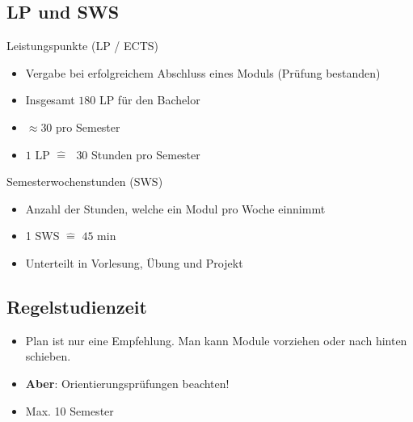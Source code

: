 \documentclass[
	aspectratio=169, 
	8pt 
]{beamer}
\begin{document}
\subsection{LP und SWS}
\begin{frame}{\insertsubsection}
    \begin{fancycolumns}[T]

        \begin{definition}{Leistungspunkte (LP / ECTS)\footnotemark[1]}
            \begin{itemize}
                \item Vergabe bei erfolgreichem Abschluss eines Moduls (Prüfung bestanden)
                \item Insgesamt $180$ LP für den Bachelor
                \item $\approx 30$ pro Semester
                \item $1 \text{ LP } \hat{=} \text{ } 30$ Stunden pro Semester
            \end{itemize}
        \end{definition}

        \nextcolumn
        
        \begin{definition}{Semesterwochenstunden (SWS)\footnotemark[2]}
            \begin{itemize}
                \item Anzahl der Stunden, welche ein Modul pro Woche einnimmt
                \item 1 SWS $\hat{=}$ $45$ min
                \item Unterteilt in Vorlesung, Übung und Projekt
            \end{itemize}
        \end{definition}
    \end{fancycolumns}

\end{frame}


\subsection{Regelstudienzeit}
\begin{frame}{\insertsubsection}
    \begin{itemize}
        \item Plan ist nur eine Empfehlung. Man kann Module vorziehen oder nach hinten schieben.
        \item \textbf{Aber}: Orientierungsprüfungen beachten! 
        \item Max. 10 Semester
    \end{itemize}
\end{frame}
    
\end{document}
